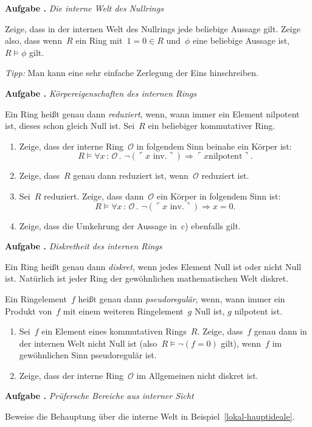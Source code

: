 \documentclass[a4paper,ngerman,12pt]{scrartcl}
\theoremstyle{definition}
\theoremstyle{plain}
\theoremstyle{remark}
\renewcommand{\O}{\mathcal{O}}
\renewcommand{\_}{\mathpunct{.}\,}
\newcommand{\?}{\,{:}\,}
\newcommand{\speak}[1]{\ulcorner\text{#1}\urcorner}
\newlength{\aufgabenskip}
\newcounter{aufgabennummer}
\newenvironment{aufgabe}[1]{
  \addtocounter{aufgabennummer}{1}
  \textbf{Aufgabe \theaufgabennummer{}.} \emph{#1} \par
}{\vspace{\aufgabenskip}}
\begin{document}
\begin{aufgabe}{Die interne Welt des Nullrings}
Zeige, dass in der internen Welt des Nullrings jede beliebige Aussage gilt.
Zeige also, dass wenn~$R$ ein Ring mit~$1 = 0 \in R$ und~$\phi$ eine beliebige
Aussage ist, $R \models \phi$ gilt.

\emph{Tipp:} Man kann eine sehr einfache Zerlegung der Eins hinschreiben.
\end{aufgabe}

\begin{aufgabe}{Körpereigenschaften des internen Rings}
Ein Ring heißt genau dann \emph{reduziert}, wenn, wann immer ein Element
nilpotent ist, dieses schon gleich Null ist.
Sei~$R$ ein beliebiger kommutativer Ring.
\begin{enumerate}
\item Zeige, dass der interne Ring~$\O$ in folgendem Sinn beinahe ein Körper
ist:
\[ R \models \forall x\?\O\_ \neg(\speak{$x$ inv.}) \Rightarrow \speak{$x$
nilpotent}. \]
\vspace*{-1.8em}%
\item Zeige, dass~$R$ genau dann reduziert ist, wenn~$\O$ reduziert ist.
\item Sei~$R$ reduziert. Zeige, dass dann~$\O$ ein Körper in folgendem Sinn
ist:
\[ R \models \forall x\?\O\_ \neg(\speak{$x$ inv.}) \Rightarrow x = 0. \]
\vspace*{-1.8em}%
\item Zeige, dass die Umkehrung der Aussage in~c) ebenfalls gilt.
\end{enumerate}
\end{aufgabe}

\begin{aufgabe}{Diskretheit des internen Rings}
Ein Ring heißt genau dann \emph{diskret}, wenn jedes Element Null ist oder
nicht Null ist. Natürlich ist jeder Ring der gewöhnlichen mathematischen Welt
diskret.

Ein Ringelement~$f$ heißt genau dann \emph{pseudoregulär}, wenn,
wann immer ein Produkt von~$f$ mit einem weiteren Ringelement~$g$ Null ist, $g$
nilpotent ist.
\begin{enumerate}
\item Sei~$f$ ein Element eines kommutativen Rings~$R$. Zeige, dass~$f$ genau
dann in der internen Welt nicht Null ist (also~$R \models \neg(f = 0)$ gilt),
wenn~$f$ im gewöhnlichen Sinn pseudoregulär ist.
\item Zeige, dass der interne Ring~$\O$ im Allgemeinen nicht diskret ist.
\end{enumerate}
\end{aufgabe}

\begin{aufgabe}{Prüfersche Bereiche aus interner Sicht}
Beweise die Behauptung über die interne Welt in
Beispiel~\ref{lokal-hauptideale}.
\end{aufgabe}
\end{document}
